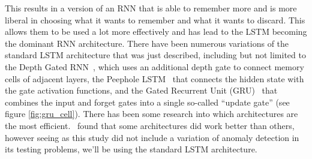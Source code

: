 This results in a version of an RNN that is able to remember more and is more liberal in choosing what it wants to remember and what it wants to discard. This allows them to be used a lot more effectively and has lead to the LSTM becoming the dominant RNN architecture. There have been numerous variations of the standard LSTM architecture that was just described, including but not limited to the Depth Gated RNN~\cite{yao2015depth}, which uses an additional depth gate to connect memory cells of adjacent layers, the Peephole LSTM~\cite{gers2002learning} that connects the hidden state with the gate activation functions, and the Gated Recurrent Unit (GRU)~\cite{cho2014learning} that combines the input and forget gates into a single so-called \enquote{update gate} (see figure \ref{fig:gru_cell}). There has been some research into which architectures are the most efficient.~\cite{jozefowicz2015empirical} found that some architectures did work better than others, however seeing as this study did not include a variation of anomaly detection in its testing problems, we'll be using the standard LSTM architecture.